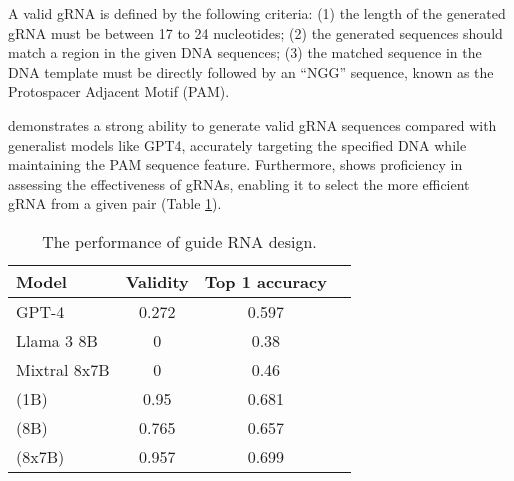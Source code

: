 A valid gRNA is defined by the following criteria: (1) the length of the generated gRNA must be between 17 to 24 nucleotides;  (2) the generated sequences should match a region in the given DNA sequences; (3) the matched sequence in the DNA template must be directly followed by an ``NGG'' sequence, known as the Protospacer Adjacent Motif (PAM).

\ourM{} demonstrates a strong ability to generate valid gRNA sequences compared with  generalist models like GPT4, accurately targeting the specified DNA while maintaining the PAM sequence feature. Furthermore, \ourM{} shows proficiency in assessing the effectiveness of gRNAs, enabling it to select the more efficient gRNA from a given pair (Table \ref{tab:RNA:RNA generation tasks}). 
\begin{table}[!htbp]
\centering
\begin{tabular}{lccc}
\toprule
Model & Validity & Top 1 accuracy\\
\midrule
GPT-4 & 0.272 & 0.597 \\
Llama 3 8B & 0 & 0.38 \\
Mixtral 8x7B & 0 & 0.46 \\
\midrule
\ourM{} (1B) & 0.95 & 0.681 \\
\ourM{} (8B) & 0.765 & 0.657 \\
\ourM{} (8x7B) & 0.957 & 0.699 \\
\bottomrule
\end{tabular}
\caption{The performance of guide RNA design.}
\label{tab:RNA:RNA generation tasks}
\end{table}





